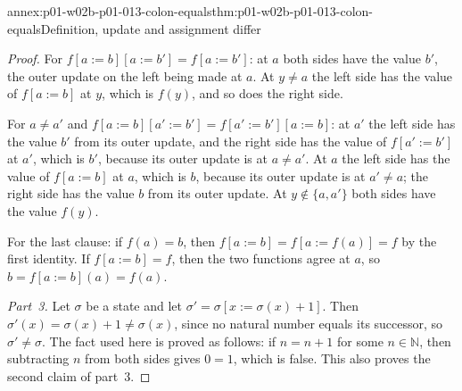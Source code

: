 \begin{annexitem}{annex:p01-w02b-p01-013-colon-equals}{thm:p01-w02b-p01-013-colon-equals}{Definition, update and assignment differ}
\begin{proof}
For \(f[a:=b][a:=b']=f[a:=b']\): at \(a\) both sides have the value \(b'\),
the outer update on the left being made at \(a\).  At \(y\neq a\) the left
side has the value of \(f[a:=b]\) at \(y\), which is \(f(y)\), and so does
the right side.

For \(a\neq a'\) and \(f[a:=b][a':=b']=f[a':=b'][a:=b]\): at \(a'\) the left
side has the value \(b'\) from its outer update, and the right side has the
value of \(f[a':=b']\) at \(a'\), which is \(b'\), because its outer update is
at \(a\neq a'\).  At \(a\) the left side has the value of \(f[a:=b]\) at
\(a\), which is \(b\), because its outer update is at \(a'\neq a\); the right
side has the value \(b\) from its outer update.  At \(y\notin\{a,a'\}\) both
sides have the value \(f(y)\).

For the last clause: if \(f(a)=b\), then \(f[a:=b]=f[a:=f(a)]=f\) by the
first identity.  If \(f[a:=b]=f\), then the two functions agree at \(a\),
so \(b=f[a:=b](a)=f(a)\).

\emph{Part~3.}  Let \(\sigma\) be a state and let
\(\sigma'=\sigma[x:=\sigma(x)+1]\).  Then
\(\sigma'(x)=\sigma(x)+1\neq\sigma(x)\), since no natural number equals its
successor, so \(\sigma'\neq\sigma\).  The fact used here is proved as
follows: if \(n=n+1\) for some \(n\in\mathbb N\), then subtracting \(n\)
from both sides gives \(0=1\), which is false.  This also proves the second
claim of part~3.
\end{proof}
\end{annexitem}
